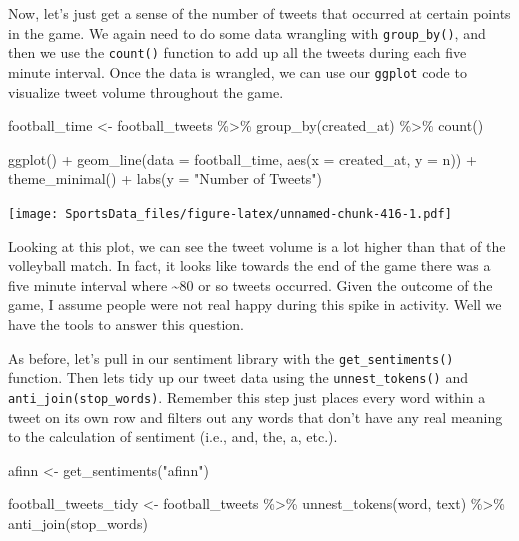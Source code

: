 \documentclass[
]{book}
\newenvironment{Shaded}{\begin{snugshade}}{\end{snugshade}}
\newcommand{\AttributeTok}[1]{\textcolor[rgb]{0.77,0.63,0.00}{#1}}
\newcommand{\FunctionTok}[1]{\textcolor[rgb]{0.00,0.00,0.00}{#1}}
\newcommand{\NormalTok}[1]{#1}
\newcommand{\OtherTok}[1]{\textcolor[rgb]{0.56,0.35,0.01}{#1}}
\newcommand{\SpecialCharTok}[1]{\textcolor[rgb]{0.00,0.00,0.00}{#1}}
\newcommand{\StringTok}[1]{\textcolor[rgb]{0.31,0.60,0.02}{#1}}
\begin{document}
Now, let's just get a sense of the number of tweets that occurred at certain points in the game. We again need to do some data wrangling with \texttt{group\_by()}, and then we use the \texttt{count()} function to add up all the tweets during each five minute interval. Once the data is wrangled, we can use our \texttt{ggplot} code to visualize tweet volume throughout the game.

\begin{Shaded}
\begin{Highlighting}[]
\NormalTok{football\_time }\OtherTok{\textless{}{-}}\NormalTok{ football\_tweets }\SpecialCharTok{\%\textgreater{}\%}
  \FunctionTok{group\_by}\NormalTok{(created\_at) }\SpecialCharTok{\%\textgreater{}\%} 
  \FunctionTok{count}\NormalTok{()}

\FunctionTok{ggplot}\NormalTok{() }\SpecialCharTok{+}
  \FunctionTok{geom\_line}\NormalTok{(}\AttributeTok{data =}\NormalTok{ football\_time, }\FunctionTok{aes}\NormalTok{(}\AttributeTok{x =}\NormalTok{ created\_at, }\AttributeTok{y =}\NormalTok{ n)) }\SpecialCharTok{+}
  \FunctionTok{theme\_minimal}\NormalTok{() }\SpecialCharTok{+}
  \FunctionTok{labs}\NormalTok{(}\AttributeTok{y =} \StringTok{"Number of Tweets"}\NormalTok{)}
\end{Highlighting}
\end{Shaded}

\texttt{[image: SportsData\_files/figure-latex/unnamed-chunk-416-1.pdf]}

Looking at this plot, we can see the tweet volume is a lot higher than that of the volleyball match. In fact, it looks like towards the end of the game there was a five minute interval where \textasciitilde80 or so tweets occurred. Given the outcome of the game, I assume people were not real happy during this spike in activity. Well we have the tools to answer this question.

As before, let's pull in our sentiment library with the \texttt{get\_sentiments()} function. Then lets tidy up our tweet data using the \texttt{unnest\_tokens()} and \texttt{anti\_join(stop\_words)}. Remember this step just places every word within a tweet on its own row and filters out any words that don't have any real meaning to the calculation of sentiment (i.e., and, the, a, etc.).

\begin{Shaded}
\begin{Highlighting}[]
\NormalTok{afinn }\OtherTok{\textless{}{-}} \FunctionTok{get\_sentiments}\NormalTok{(}\StringTok{"afinn"}\NormalTok{)}

\NormalTok{football\_tweets\_tidy }\OtherTok{\textless{}{-}}\NormalTok{ football\_tweets }\SpecialCharTok{\%\textgreater{}\%} 
  \FunctionTok{unnest\_tokens}\NormalTok{(word, text) }\SpecialCharTok{\%\textgreater{}\%} 
  \FunctionTok{anti\_join}\NormalTok{(stop\_words) }
\end{Highlighting}
\end{Shaded}
\end{document}
